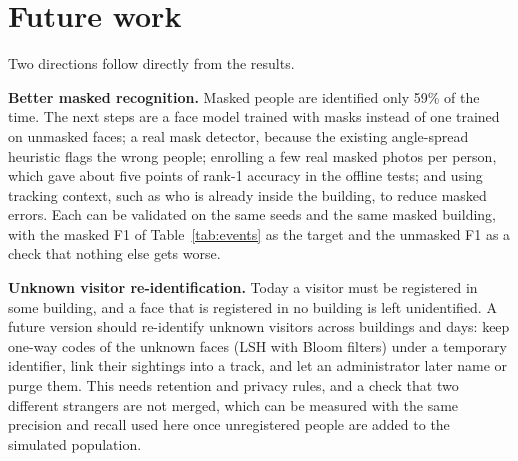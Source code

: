 \documentclass[12pt,a4paper,oneside]{report}
\begin{document}
\section{Future work}
Two directions follow directly from the results.

\textbf{Better masked recognition.} Masked people are identified only 59\% of the time. The next steps are a face model trained with masks instead of one trained on unmasked faces; a real mask detector, because the existing angle-spread heuristic flags the wrong people; enrolling a few real masked photos per person, which gave about five points of rank-1 accuracy in the offline tests; and using tracking context, such as who is already inside the building, to reduce masked errors. Each can be validated on the same seeds and the same masked building, with the masked F1 of Table~\ref{tab:events} as the target and the unmasked F1 as a check that nothing else gets worse.

\textbf{Unknown visitor re-identification.} Today a visitor must be registered in some building, and a face that is registered in no building is left unidentified. A future version should re-identify unknown visitors across buildings and days: keep one-way codes of the unknown faces (LSH with Bloom filters) under a temporary identifier, link their sightings into a track, and let an administrator later name or purge them. This needs retention and privacy rules, and a check that two different strangers are not merged, which can be measured with the same precision and recall used here once unregistered people are added to the simulated population.

\clearpage
\renewcommand{\bibname}{References}
\end{document}
